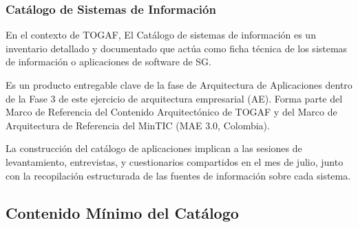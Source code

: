 \documentclass[
	a4paper, %
	12pt, %
]{include/CSSullivanBusinessReport}
\begin{document}
\subsubsection{Catálogo de Sistemas de
Información}\label{sec:catuxe1logo-de-sistemas-de-informaciuxf3n}

En el contexto de TOGAF, El Catálogo de sistemas de información es un
inventario detallado y documentado que actúa como ficha técnica de los
sistemas de información o aplicaciones de software de SG.

Es un producto entregable clave de la fase de Arquitectura de
Aplicaciones dentro de la Fase 3 de este ejercicio de arquitectura
empresarial (AE). Forma parte del Marco de Referencia del Contenido
Arquitectónico de TOGAF y del Marco de Arquitectura de Referencia del
MinTIC (MAE 3.0, Colombia).

La construcción del catálogo de aplicaciones implican a las sesiones de
levantamiento, entrevistas, y cuestionarios compartidos en el mes de
julio, junto con la recopilación estructurada de las fuentes de
información sobre cada sistema.

\subsection{Contenido Mínimo del
Catálogo}\label{sec:contenido-muxednimo-del-catuxe1logo}
\end{document}

